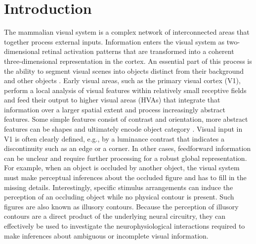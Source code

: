 \documentclass[12pt]{article}
\begin{document}
\section*{Introduction}
The mammalian visual system is a complex network of interconnected areas that together process external inputs. Information enters the visual system as two-dimensional retinal activation patterns that are transformed into a coherent three-dimensional representation in the cortex. An essential part of this process is the ability to segment visual scenes into objects distinct from their background and other objects \autocite{kirchbergerEssentialRoleFeedback2020}. Early visual areas, such as the primary visual cortex (V1), perform a local analysis of visual features within relatively small receptive fields and feed their output to higher visual areas (HVAs) that integrate that information over a larger spatial extent and process increasingly abstract features. Some simple features consist of contrast and orientation, more abstract features can be shapes and ultimately encode object category \autocite{ashbridgeEffectImageOrientation2000}. Visual input in V1 is often clearly defined, e.g., by a luminance contrast that indicates a discontinuity such as an edge or a corner. In other cases, feedforward information can be unclear and require further processing for a robust global representation. For example, when an object is occluded by another object, the visual system must make perceptual inferences about the occluded figure and has to fill in the missing details. Interestingly, specific stimulus arrangements can induce the perception of an occluding object while no physical contour is present. Such figures are also known as illusory contours. Because the perception of illusory contours are a direct product of the underlying neural circuitry, they can effectively be used to investigate the neurophysiological interactions required to make inferences about ambiguous or incomplete visual information.
\bigbreak
\end{document}

